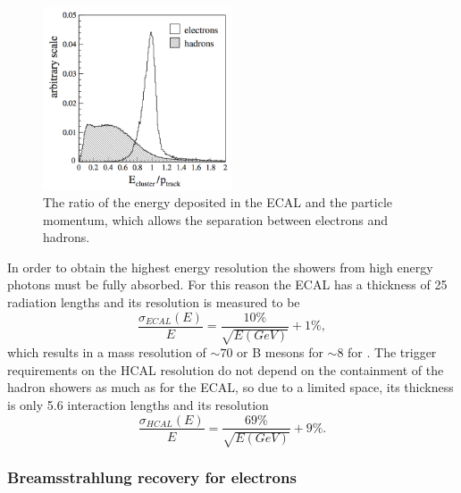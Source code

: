 \begin{figure}[t!]
\centering
\includegraphics[width=0.5\textwidth]{Detector/figs/pi0_e_pid_perf.png}
\caption{The ratio of the energy deposited in the ECAL and the particle momentum, which allows
the separation between electrons and hadrons. }
\label{fig:pi0_e_pid_perf}
\end{figure}

In order to obtain the highest energy resolution the showers from high energy photons 
must be fully absorbed. For this reason the ECAL has a thickness of 25 radiation lengths and its resolution is 
measured to be~\cite{Alves:2008zz}
 \begin{equation}
 \frac{\sigma_{ECAL}(E)}{E} = \frac{10\%}{\sqrt{E(GeV)}} + 1\%,
 \end{equation}
%
which results in a mass resolution of $\sim 70$ \mevcc or B mesons for $\sim 8$ \mevcc for \piz.
The trigger requirements on the HCAL resolution do not depend on the containment of the hadron showers as much 
as for the ECAL, so due to a limited space, its thickness is only 5.6 interaction lengths and its resolution
%
 \begin{equation}
 \frac{\sigma_{HCAL}(E)}{E} = \frac{69\%}{\sqrt{E(GeV)}} + 9\%.
 \end{equation}

\subsubsection{Breamsstrahlung recovery for electrons}

